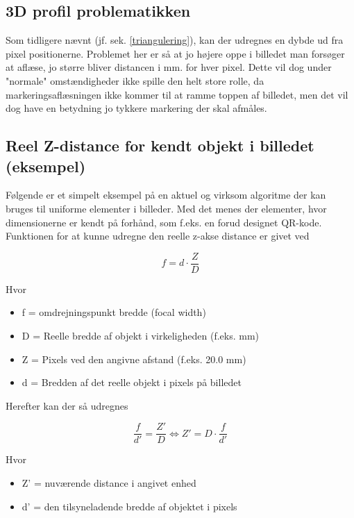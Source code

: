 \subsection{3D profil problematikken}

Som tidligere nævnt (jf. sek. \ref{triangulering}), kan der udregnes en dybde ud fra pixel positionerne. Problemet her er så at jo højere oppe i billedet man forsøger at aflæse, jo større bliver distancen i mm. for hver pixel. Dette vil dog under "normale" omstændigheder ikke spille den helt store rolle, da markeringsaflæsningen ikke kommer til at ramme toppen af billedet, men det vil dog have en betydning jo tykkere markering der skal afmåles.

\subsection{Reel Z-distance for kendt objekt i billedet (eksempel)}

Følgende er et simpelt eksempel på en aktuel og virksom algoritme der kan bruges til uniforme elementer i billeder.
Med det menes der elementer, hvor dimensionerne er kendt på forhånd, som f.eks. en forud designet QR-kode.
Funktionen for at kunne udregne den reelle z-akse distance er givet ved

\begin{equation}
    f = d \cdot \frac{Z}{D}
\end{equation}

Hvor

\begin{itemize}
    \item f = omdrejningspunkt bredde (focal width)
    \item D = Reelle bredde af objekt i virkeligheden (f.eks. mm)
    \item Z = Pixels ved den angivne afstand (f.eks. 20.0 mm)
    \item d = Bredden af det reelle objekt i pixels på billedet
\end{itemize}

Herefter kan der så udregnes

\begin{equation}
    \frac{f}{d'} = \frac{Z'}{D} \Leftrightarrow Z' = D \cdot \frac{f}{d'}
\end{equation}

Hvor

\begin{itemize}
    \item Z' = nuværende distance i angivet enhed 
    \item d' = den tilsyneladende bredde af objektet i pixels
\end{itemize}


